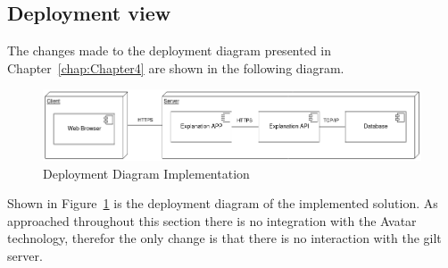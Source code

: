 \subsection{Deployment view}

The changes made to the deployment diagram presented in Chapter~\ref{chap:Chapter4} are shown in the following diagram.

\begin{figure}[H]
\centering
\includegraphics[width=\textwidth,keepaspectratio]{ch5/assets/deployment_diagram_Implement.png}
\caption[Deployment Diagram Implementation]{Deployment Diagram Implementation}
\label{fig:deployImp}
\end{figure}

Shown in Figure~\ref{fig:deployImp} is the deployment diagram of the implemented solution.
As approached throughout this section there is no integration with the Avatar technology, therefor the only change is that there is no interaction with the gilt server.
